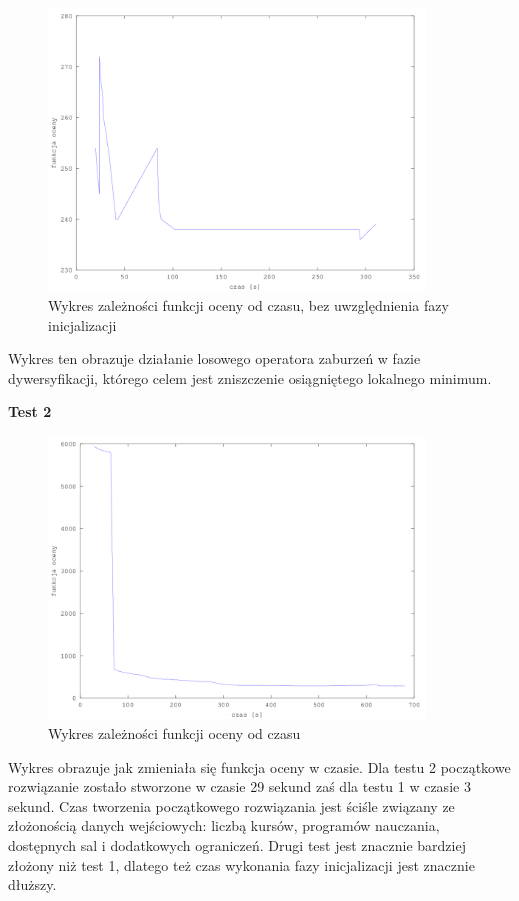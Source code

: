 \begin{figure}[H]
  \caption{Wykres zależności funkcji oceny od czasu, bez uwzględnienia fazy inicjalizacji}
  \centering
    \includegraphics[width=10cm]{szczeg.png}
\end{figure}
Wykres ten obrazuje działanie losowego operatora zaburzeń w fazie dywersyfikacji, którego celem jest zniszczenie osiągniętego lokalnego minimum.
\par \textbf{Test 2}
\begin{figure}[H]
  \caption{Wykres zależności funkcji oceny od czasu}
  \centering
    \includegraphics[width=10cm]{ogolny2_instancja.png}
\end{figure}
Wykres obrazuje jak zmieniała się funkcja oceny w czasie. Dla testu 2 początkowe rozwiązanie zostało stworzone w czasie 29 sekund zaś dla testu 1 w czasie 3 sekund. Czas tworzenia początkowego rozwiązania jest ściśle związany ze złożonością danych wejściowych: liczbą kursów, programów nauczania, dostępnych sal i dodatkowych ograniczeń. Drugi test jest znacznie bardziej złożony niż test 1, dlatego też czas wykonania fazy inicjalizacji jest znacznie dłuższy.
